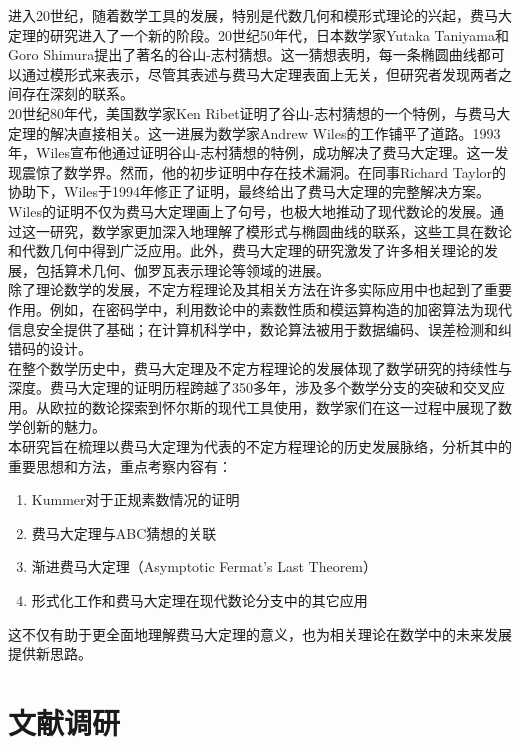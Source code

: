 \documentclass{article}
\begin{document}
\noindent
进入20世纪，随着数学工具的发展，特别是代数几何和模形式理论的兴起，费马大定理的研究进入了一个新的阶段。20世纪50年代，日本数学家Yutaka Taniyama和Goro Shimura提出了著名的谷山-志村猜想。这一猜想表明，每一条椭圆曲线都可以通过模形式来表示，尽管其表述与费马大定理表面上无关，但研究者发现两者之间存在深刻的联系。\\

\noindent
20世纪80年代，美国数学家Ken Ribet证明了谷山-志村猜想的一个特例，与费马大定理的解决直接相关。这一进展为数学家Andrew Wiles的工作铺平了道路。1993年，Wiles宣布他通过证明谷山-志村猜想的特例，成功解决了费马大定理。这一发现震惊了数学界。然而，他的初步证明中存在技术漏洞。在同事Richard Taylor的协助下，Wiles于1994年修正了证明，最终给出了费马大定理的完整解决方案。\\

\noindent
Wiles的证明不仅为费马大定理画上了句号，也极大地推动了现代数论的发展。通过这一研究，数学家更加深入地理解了模形式与椭圆曲线的联系，这些工具在数论和代数几何中得到广泛应用。此外，费马大定理的研究激发了许多相关理论的发展，包括算术几何、伽罗瓦表示理论等领域的进展。\\

\noindent
除了理论数学的发展，不定方程理论及其相关方法在许多实际应用中也起到了重要作用。例如，在密码学中，利用数论中的素数性质和模运算构造的加密算法为现代信息安全提供了基础；在计算机科学中，数论算法被用于数据编码、误差检测和纠错码的设计。\\

\noindent
在整个数学历史中，费马大定理及不定方程理论的发展体现了数学研究的持续性与深度。费马大定理的证明历程跨越了350多年，涉及多个数学分支的突破和交叉应用。从欧拉的数论探索到怀尔斯的现代工具使用，数学家们在这一过程中展现了数学创新的魅力。\\

\noindent
本研究旨在梳理以费马大定理为代表的不定方程理论的历史发展脉络，分析其中的重要思想和方法，重点考察内容有：
\begin{enumerate}
\item Kummer对于正规素数情况的证明
\item 费马大定理与ABC猜想的关联
\item 渐进费马大定理（Asymptotic Fermat's Last Theorem）
\item 形式化工作和费马大定理在现代数论分支中的其它应用
\end{enumerate}
这不仅有助于更全面地理解费马大定理的意义，也为相关理论在数学中的未来发展提供新思路。

\newpage
\section{文献调研}
\end{document}
